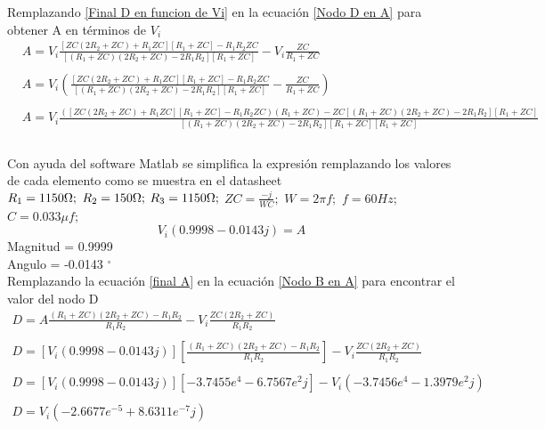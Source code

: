     Remplazando \ref{Final D en funcion de Vi} en la ecuación \ref{Nodo D en A} para obtener A en términos de $V_{i}$
    \begin{align*}
        &A = V_{i}\frac{ [ZC(2R_{2}+ZC)+ R_{1}ZC][R_{1}+ZC] - R_{1}R_{2}ZC }{ [(R_{1}+ZC)(2R_{2}+ZC) -  2R_{1}R_{2}][R_{1}+ZC]} - V_{i}\frac{ZC}{R_{1}+ZC}\\\\
        &A = V_{i}(\frac{ [ZC(2R_{2}+ZC)+ R_{1}ZC][R_{1}+ZC] - R_{1}R_{2}ZC }{ [(R_{1}+ZC)(2R_{2}+ZC) -  2R_{1}R_{2}][R_{1}+ZC]} - \frac{ZC}{R_{1}+ZC})\\\\
        &A = V_{i}\frac{ ([ZC(2R_{2}+ZC)+ R_{1}ZC][R_{1}+ZC] - R_{1}R_{2}ZC)(R_{1}+ZC) - ZC[(R_{1}+ZC)(2R_{2}+ZC) -  2R_{1}R_{2}][R_{1}+ZC] }{ [(R_{1}+ZC)(2R_{2}+ZC) -  2R_{1}R_{2}][R_{1}+ZC][R_{1}+ZC] }\\\\
    \end{align*}













    Con ayuda del software Matlab se simplifica la expresión remplazando los valores de cada elemento como se muestra en el datasheet
    \\
    $ R_{1} = 1150 \ohm;$ $R_{2} = 150 \ohm;$ $R_{3} = 1150 \ohm;$ $ZC = \frac{-j}{WC};$
    $W = 2 \pi f;$ $f = 60 Hz;$ $C = 0.033\mu f ;$
    \begin{equation}\label{final A}
        V_{i}(0.9998 - 0.0143j)=A
    \end{equation}
    Magnitud = 0.9999 \\
    Angulo = -0.0143 $^{\circ}$ \\
    Remplazando la ecuación \ref{final A} en la ecuación \ref{Nodo B en A} para encontrar el valor del nodo D
    \begin{align*}
        D = A\frac{(R_{1}+ZC)(2R_{2}+ZC) - R_{1}R_{2}}{R_{1}R_{2}} - V_{i}\frac{ZC(2R_{2}+ZC)}{R_{1}R_{2}}\\\\
        D = [V_{i}(0.9998 - 0.0143j)] [\frac{(R_{1}+ZC)(2R_{2}+ZC) - R_{1}R_{2}}{R_{1}R_{2}}] - V_{i}\frac{ZC(2R_{2}+ZC)}{R_{1}R_{2}}\\\\
        D = [V_{i}(0.9998 - 0.0143j)] [-3.7455e^{4} - 6.7567e^{2}j] - V_{i}(-3.7456e^{4} - 1.3979e^{2}j)\\\\
        D = V_{i} (-2.6677e^{-5} + 8.6311e^{-7}j) \\\\
    \end{align*}
    
